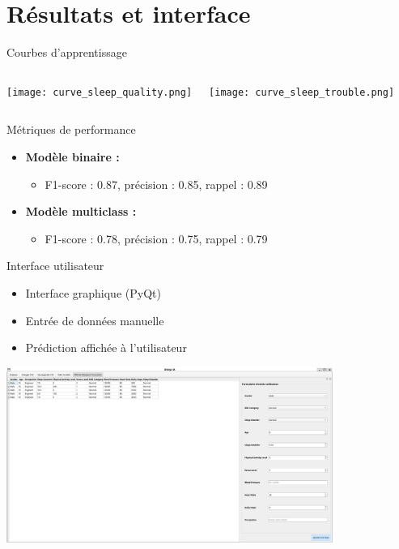\documentclass{beamer}
\begin{document}
\section{Résultats et interface}

\begin{frame}{Courbes d'apprentissage}
  \begin{columns}
    \texttt{[image: curve\_sleep\_quality.png]}

    \texttt{[image: curve\_sleep\_trouble.png]}
  \end{columns}
\end{frame}

\begin{frame}{Métriques de performance}
  \begin{itemize}
    \item \textbf{Modèle binaire :}
    \begin{itemize}
      \item F1-score : 0.87, précision : 0.85, rappel : 0.89
    \end{itemize}
    \item \textbf{Modèle multiclass :}
    \begin{itemize}
      \item F1-score : 0.78, précision : 0.75, rappel : 0.79
    \end{itemize}
  \end{itemize}
\end{frame}

\begin{frame}{Interface utilisateur}
  \begin{itemize}
    \item Interface graphique (PyQt)
    \item Entrée de données manuelle
    \item Prédiction affichée à l'utilisateur
  \end{itemize}
  \includegraphics[width=0.8\textwidth]{screen_UI.png}
\end{frame}
\end{document}
